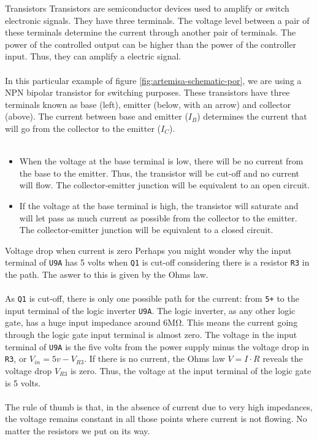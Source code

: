 \begin{theory}[htbp]{Transistors}
  Transistors are semiconductor devices used to amplify or switch electronic signals. They have three terminals. The voltage level between a pair of these terminals determine the current through another pair of terminals. The power of the controlled output can be higher than the power of the controller input. Thus, they can amplify a electric signal.\\\\

  In this particular example of figure \ref{fig:artemisa-schematic-por}, we are using a NPN bipolar transistor for switching purposes. These transistors have three terminals known as base (left), emitter (below, with an arrow) and collector (above). The current between base and emitter ($I_B$) determines the current that will go from the collector to the emitter ($I_C$).\\\\

  \begin{itemize}
    \item When the voltage at the base terminal is low, there will be no current from the base to the emitter. Thus, the transistor will be cut-off and no current will flow. The collector-emitter junction will be equivalent to an open circuit.
    \item If the voltage at the base terminal is high, the transistor will saturate and will let pass as much current as possible from the collector to the emitter. The collector-emitter junction will be equivalent to a closed circuit.
  \end{itemize}
\end{theory}

\begin{theory}[htbp]{Voltage drop when current is zero}
  Perhaps you might wonder why the input terminal of {\tt U9A} has 5 volts when {\tt Q1} is cut-off considering there is a resistor {\tt R3} in the path. The aswer to this is given by the Ohms law.\\\\

  As {\tt Q1} is cut-off, there is only one possible path for the current: from {\tt 5+} to the input terminal of the logic inverter {\tt U9A}. The logic inverter, as any other logic gate, has a huge input impedance around 6M\si{\ohm}. This means the current going through the logic gate input terminal is almost zero. The voltage in the input terminal of {\tt U9A} is the five volts from the power supply minus the voltage drop in {\tt R3}, or $V_{in} = 5v - V_{R3}$. If there is no current, the Ohms law $V=I \cdot R$ reveals the voltage drop $V_{R3}$ is zero. Thus, the voltage at the input terminal of the logic gate is 5 volts.\\\\

  The rule of thumb is that, in the absence of current due to very high impedances, the voltage remains constant in all those points where current is not flowing. No matter the resistors we put on its way.
\end{theory}

